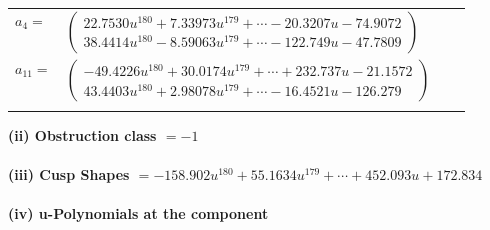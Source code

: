 \documentclass[1p]{elsarticle_modified}
\theoremstyle{definition}
\begin{document}
\begin{tabular}{m{7pt} m{180pt} m{7pt} m{180pt} }
\flushright $a_{4}=$&$\begin{pmatrix}22.7530 u^{180}+7.33973 u^{179}+\cdots-20.3207 u-74.9072\\38.4414 u^{180}-8.59063 u^{179}+\cdots-122.749 u-47.7809\end{pmatrix}$ \\
\flushright $a_{11}=$&$\begin{pmatrix}-49.4226 u^{180}+30.0174 u^{179}+\cdots+232.737 u-21.1572\\43.4403 u^{180}+2.98078 u^{179}+\cdots-16.4521 u-126.279\end{pmatrix}$\\&\end{tabular}
\flushleft \textbf{(ii) Obstruction class $= -1$}\\~\\
\flushleft \textbf{(iii) Cusp Shapes $= -158.902 u^{180}+55.1634 u^{179}+\cdots+452.093 u+172.834$}\\~\\
\newpage\renewcommand{\arraystretch}{1}
\flushleft \textbf{(iv) u-Polynomials at the component}\newline \\
\end{document}
